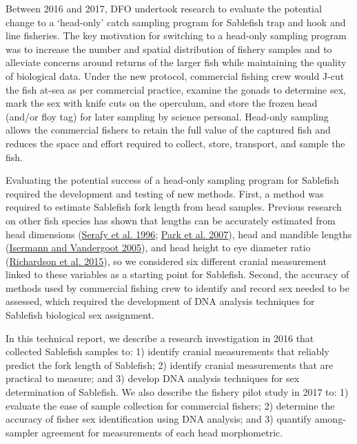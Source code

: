\documentclass[12pt]{article}\usepackage[]{graphicx}\usepackage[]{color}
\begin{document}
Between 2016 and 2017, DFO undertook research to evaluate the potential change to a `head-only' catch sampling program for Sablefish trap and hook and line fisheries. The key motivation for switching to a head-only sampling program was to increase the number and spatial distribution of fishery samples and to alleviate concerns around returns of the larger fish while maintaining the quality of biological data. Under the new protocol, commercial fishing crew would J-cut the fish at-sea as per commercial practice, examine the gonads to determine sex, mark the sex with knife cuts on the operculum, and store the frozen head (and/or floy tag) for later sampling by science personal. Head-only sampling allows the commercial fishers to retain the full value of the captured fish and reduces the space and effort required to collect, store, transport, and sample the fish.

Evaluating the potential success of a head-only sampling program for Sablefish required the development and testing of new methods. First, a method was required to estimate Sablefish fork length from head samples. Previous research on other fish species has shown that lengths can be accurately estimated from head dimensions (\protect\hyperlink{ref-Serafy1996}{Serafy et al. 1996}; \protect\hyperlink{ref-Park2007}{Park et al. 2007}), head and mandible lengths (\protect\hyperlink{ref-Isermann2005}{Isermann and Vandergoot 2005}), and head height to eye diameter ratio (\protect\hyperlink{ref-Richardson2015}{Richardson et al. 2015}), so we considered six different cranial measurement linked to these variables as a starting point for Sablefish. Second, the accuracy of methods used by commercial fishing crew to identify and record sex needed to be assessed, which required the development of DNA analysis techniques for Sablefish biological sex assignment.

In this technical report, we describe a research investigation in 2016 that collected Sablefish samples to: 1) identify cranial measurements that reliably predict the fork length of Sablefish; 2) identify cranial measurements that are practical to measure; and 3) develop DNA analysis techniques for sex determination of Sablefish. We also describe the fishery pilot study in 2017 to: 1) evaluate the ease of sample collection for commercial fishers; 2) determine the accuracy of fisher sex identification using DNA analysis; and 3) quantify among-sampler agreement for measurements of each head morphometric.

\clearpage
\end{document}
